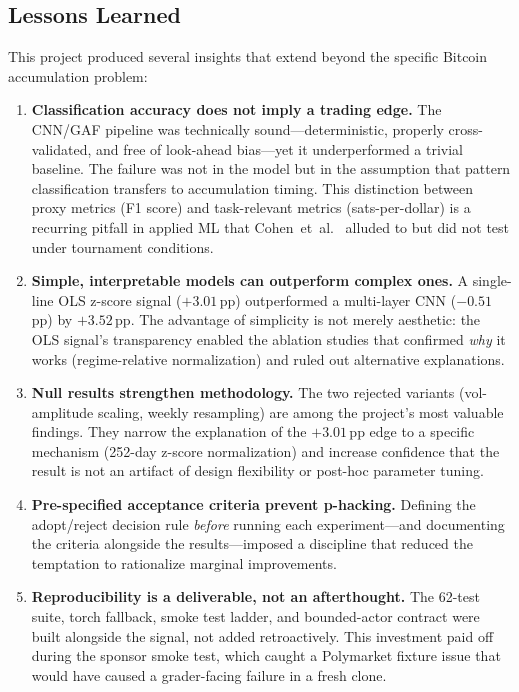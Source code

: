 \documentclass[11pt,letterpaper]{article}
\begin{document}
\subsection{Lessons Learned}
\label{sec:lessons}

This project produced several insights that extend beyond the specific
Bitcoin accumulation problem:

\begin{enumerate}
  \item \textbf{Classification accuracy does not imply a trading edge.}
    The CNN/GAF pipeline was technically sound---deterministic, properly
    cross-validated, and free of look-ahead bias---yet it underperformed a
    trivial baseline.  The failure was not in the model but in the assumption
    that pattern classification transfers to accumulation timing.  This
    distinction between proxy metrics (F1 score) and task-relevant metrics
    (sats-per-dollar) is a recurring pitfall in applied ML that
    Cohen~et~al.~\cite{cohen2020} alluded to but did not test under
    tournament conditions.

  \item \textbf{Simple, interpretable models can outperform complex ones.}
    A single-line OLS z-score signal ($+3.01$\,pp) outperformed a multi-layer
    CNN ($-0.51$\,pp) by $+3.52$\,pp.  The advantage of simplicity is not
    merely aesthetic: the OLS signal's transparency enabled the ablation
    studies that confirmed \emph{why} it works (regime-relative normalization)
    and ruled out alternative explanations.

  \item \textbf{Null results strengthen methodology.}
    The two rejected variants (vol-amplitude scaling, weekly resampling) are
    among the project's most valuable findings.  They narrow the explanation
    of the $+3.01$\,pp edge to a specific mechanism (252-day z-score
    normalization) and increase confidence that the result is not an artifact
    of design flexibility or post-hoc parameter tuning.

  \item \textbf{Pre-specified acceptance criteria prevent p-hacking.}
    Defining the adopt/reject decision rule \emph{before} running each
    experiment---and documenting the criteria alongside the results---imposed
    a discipline that reduced the temptation to rationalize marginal
    improvements.

  \item \textbf{Reproducibility is a deliverable, not an afterthought.}
    The 62-test suite, torch fallback, smoke test ladder, and bounded-actor
    contract were built alongside the signal, not added retroactively.  This
    investment paid off during the sponsor smoke test, which caught a
    Polymarket fixture issue that would have caused a grader-facing failure
    in a fresh clone.
\end{enumerate}
\end{document}
